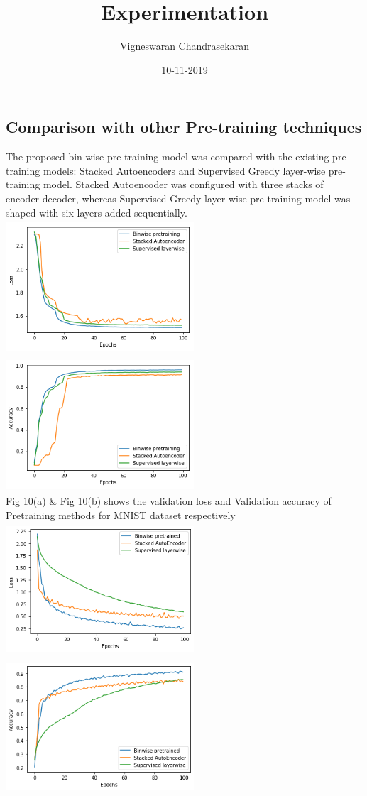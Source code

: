 \documentclass{article}
\title{Experimentation}
\author{Vigneswaran Chandrasekaran}
\date{10-11-2019}
\begin{document}
\subsection{Comparison with other Pre-training techniques}
The proposed bin-wise pre-training model was compared with the existing pre-training
models: Stacked Autoencoders and Supervised Greedy layer-wise pre-training model.
Stacked Autoencoder was configured with three stacks of encoder-decoder, whereas
Supervised Greedy layer-wise pre-training model was shaped with six layers added
sequentially.
\\
\includegraphics[width= 7cm, height=5cm]{fig7.png}
\includegraphics[width= 7cm, height=5cm]{fig8.png}
\\
Fig 10(a) \& Fig 10(b) shows the validation loss and Validation accuracy of Pretraining methods for MNIST dataset respectively
\\
\includegraphics[width= 7cm, height=5cm]{fig9.png}
\includegraphics[width= 7cm, height=5cm]{fig10.png}
\end{document}
